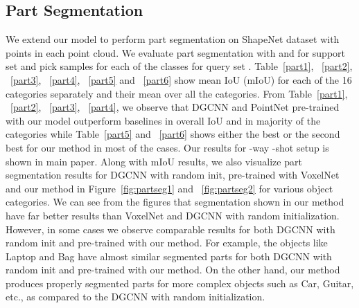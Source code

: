 \documentclass{article}
\begin{document}
\subsection{Part Segmentation}
We extend our model to perform part segmentation on ShapeNet dataset with  points in each point cloud. We evaluate part segmentation with  and  for support set  and pick  samples for each of the  classes for query set . Table~\ref{part1}, ~\ref{part2}, ~\ref{part3}, ~\ref{part4}, ~\ref{part5} and ~\ref{part6} show mean IoU (mIoU) for each of the 16 categories separately and their mean over all the categories. From Table~\ref{part1}, ~\ref{part2}, ~\ref{part3}, ~\ref{part4}, we observe that DGCNN and PointNet pre-trained with our model outperform baselines in overall IoU and in majority of the categories while Table~\ref{part5} and ~\ref{part6} shows either the best or the second best for our method in most of the cases. Our results for -way -shot setup is shown in main paper. Along with mIoU results, we also visualize part segmentation results for DGCNN with random init, pre-trained with VoxelNet and our method in Figure~\ref{fig:partseg1} and ~\ref{fig:partseg2} for various object categories. We can see from the figures that segmentation shown in our method have far better results than VoxelNet and DGCNN with random initialization. However, in some cases we observe comparable results for both DGCNN with random init and pre-trained with our method. For example, the objects like Laptop and Bag have almost similar segmented parts for both DGCNN with random init and pre-trained with our method. On the other hand, our method produces properly segmented parts for more complex objects such as Car, Guitar, etc., as compared to the DGCNN with random initialization.
\end{document}
